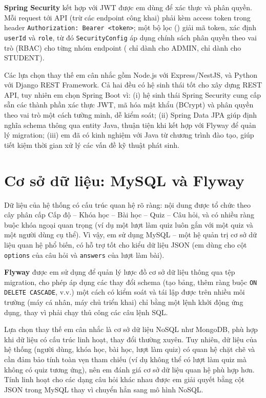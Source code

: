 \documentclass[../DoAn.tex]{subfiles}
\begin{document}
\textbf{Spring Security} kết hợp với JWT \cite{jwtrfc7519} được em dùng để xác thực và phân quyền. Mỗi request tới API (trừ các endpoint công khai) phải kèm access token trong header \texttt{Authorization: Bearer <token>}; một bộ lọc (\texttt{}) giải mã token, xác định \texttt{userId} và \texttt{role}, từ đó \texttt{SecurityConfig} áp dụng chính sách phân quyền theo vai trò (RBAC) cho từng nhóm endpoint (\texttt{} chỉ dành cho ADMIN, \texttt{} chỉ dành cho STUDENT).

Các lựa chọn thay thế em cân nhắc gồm Node.js với Express/NestJS, và Python với Django REST Framework. Cả hai đều có hệ sinh thái tốt cho xây dựng REST API, tuy nhiên em chọn Spring Boot vì: (i) hệ sinh thái Spring Security cung cấp sẵn các thành phần xác thực JWT, mã hóa mật khẩu (BCrypt) và phân quyền theo vai trò một cách tường minh, dễ kiểm soát; (ii) Spring Data JPA giúp định nghĩa schema thông qua entity Java, thuận tiện khi kết hợp với Flyway để quản lý migration; (iii) em đã có kinh nghiệm với Java từ chương trình đào tạo, giúp tiết kiệm thời gian xử lý các vấn đề kỹ thuật phát sinh.

\section{Cơ sở dữ liệu: MySQL và Flyway}
\label{section:3.3}

Dữ liệu của hệ thống có cấu trúc quan hệ rõ ràng: nội dung được tổ chức theo cây phân cấp Cấp độ -- Khóa học -- Bài học -- Quiz -- Câu hỏi, và có nhiều ràng buộc khóa ngoại quan trọng (ví dụ một lượt làm quiz luôn gắn với một quiz và một người dùng cụ thể). Vì vậy, em sử dụng MySQL \cite{mysqldocs} -- một hệ quản trị cơ sở dữ liệu quan hệ phổ biến, có hỗ trợ tốt cho kiểu dữ liệu JSON (em dùng cho cột \texttt{options} của câu hỏi và \texttt{answers} của lượt làm bài).

\textbf{Flyway} được em sử dụng để quản lý lược đồ cơ sở dữ liệu thông qua tệp migration, cho phép áp dụng các thay đổi schema (tạo bảng, thêm ràng buộc \texttt{ON DELETE CASCADE}, v.v.) một cách có kiểm soát và tái lập được trên nhiều môi trường (máy cá nhân, máy chủ triển khai) chỉ bằng một lệnh khởi động ứng dụng, thay vì phải chạy thủ công các câu lệnh SQL.

Lựa chọn thay thế em cân nhắc là cơ sở dữ liệu NoSQL như MongoDB, phù hợp khi dữ liệu có cấu trúc linh hoạt, thay đổi thường xuyên. Tuy nhiên, dữ liệu của hệ thống (người dùng, khóa học, bài học, lượt làm quiz) có quan hệ chặt chẽ và cần đảm bảo tính toàn vẹn tham chiếu (ví dụ không thể có lượt làm quiz mà không có quiz tương ứng), nên em đánh giá cơ sở dữ liệu quan hệ phù hợp hơn. Tính linh hoạt cho các dạng câu hỏi khác nhau được em giải quyết bằng cột JSON trong MySQL thay vì chuyển hẳn sang mô hình NoSQL.
\end{document}
